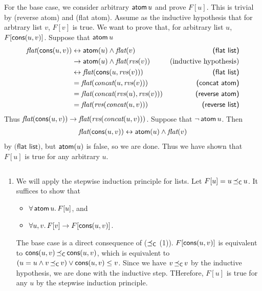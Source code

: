 \begin{exer}[4.1]
\begin{enumerate}[label=(\alph*)]
            For the base case, we consider arbitrary $\operatorname{\textsf{atom}} u$ and prove $F[u]$.
            This is trivial by \textsf{(reverse atom)} and \textsf{(flat atom)}.
            Assume as the inductive hypothesis that for arbtrary list $v$, $F[v]$ is true.
            We want to prove that, for arbitrary list $u$, $F[\operatorname{\textsf{cons}}(u, v)]$.
            Suppose that $\operatorname{\textsf{atom}} u$
            \begin{align*}
                \operatorname{\textit{flat}}(\operatorname{\textsf{cons}}(u, v))
                    &\leftrightarrow \operatorname{\textsf{atom}}(u) \land \operatorname{\textit{flat}}(v) & \textsf{(flat list)}\\
                    &\rightarrow \operatorname{\textsf{atom}}(u) \land \operatorname{\textit{flat}}(\operatorname{\textit{rvs}}(v)) & \text{(inductive hypothesis)}\\
                    &\leftrightarrow \operatorname{\textit{flat}}(\operatorname{\textsf{cons}}(u, \operatorname{\textit{rvs}}(v))) & \textsf{(flat list)} \\
                    &= \operatorname{\textit{flat}}(\operatorname{\textit{concat}}(u, \operatorname{\textit{rvs}}(v))) & \textsf{(concat atom)} \\
                    &= \operatorname{\textit{flat}}(\operatorname{\textit{concat}}(\operatorname{\textit{rvs}}(u), \operatorname{\textit{rvs}}(v))) & \textsf{(reverse atom)} \\
                    &= \operatorname{\textit{flat}}(\operatorname{\textit{rvs}}(\operatorname{\textit{concat}}(u, v))) & \textsf{(reverse list)} \\
            \end{align*}
            Thus $\operatorname{\textit{flat}}(\operatorname{\textsf{cons}}(u, v)) \rightarrow \operatorname{\textit{flat}}(\operatorname{\textit{rvs}}(\operatorname{\textit{concat}}(u, v)))$.
            Suppose that $\neg\operatorname{\textsf{atom}} u$.
            Then
            \begin{align*}
                \operatorname{\textit{flat}}(\operatorname{\textsf{cons}}(u, v)) \leftrightarrow \operatorname{\textsf{atom}}(u) \land \operatorname{\textit{flat}}(v)
            \end{align*}
            by $\textsf{(flat list)}$, but $\operatorname{\textsf{atom}}(u)$ is false, so we are done.
            Thus we have shown that $F[u]$ is true for any arbitrary $u$.
    \end{enumerate}
\end{exer}

\begin{exer}[4.2]
    $ $
    \begin{enumerate}[label=(\alph*)]
        \item
            We will apply the stepwise induction principle for lists.
            Let $F[u] = u \operatorname{\preceq_{\textsf{C}}} u$.
            It suffices to show that
            \begin{itemize}
                \item
                    $\forall \operatorname{\textsf{atom}} u.\, F[u]$, and
                \item
                    $\forall u, v.\, F[v] \rightarrow F[\operatorname{\textsf{cons}}(u, v)]$.
            \end{itemize}
            The base case is a direct consequence of \textsf{($\operatorname{\preceq_{\textsf{C}}}$ (1))}.
            $F[\operatorname{\textsf{cons}}(u, v)]$ is equivalent to $\operatorname{\textsf{cons}}(u, v) \operatorname{\preceq_{\textsf{C}}} \operatorname{\textsf{cons}}(u, v)$, which is equivalent to $(u = u \land v \operatorname{\preceq_{\textsf{C}}} v) \lor \operatorname{\textsf{cons}}(u, v) \leq v$.
            Since we have $v \operatorname{\preceq_{\textsf{C}}} v$ by the inductive hypothesis, we are done with the inductive step.
            THerefore, $F[u]$ is true for any $u$ by the stepwise induction principle.
    \end{enumerate}
\end{exer}
